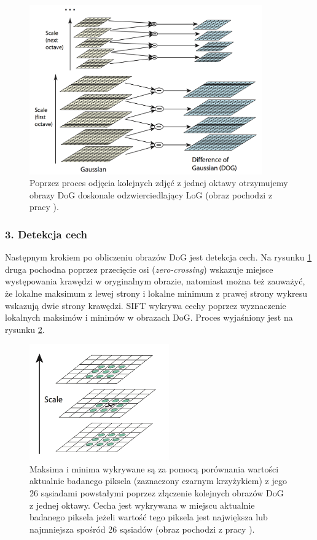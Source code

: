 \begin{figure}[htb]
  \centering
  \includegraphics[width=10cm]{gfx/dog}
  \caption{Poprzez proces odjęcia kolejnych zdjęć z jednej oktawy otrzymujemy obrazy DoG doskonale odzwierciedlający LoG (obraz pochodzi z pracy \cite{Lowe:2004:DIF:993451.996342}).}
  \label{fig:proponowane_algorytmy:dog}
\end{figure}

\subsubsection{3. Detekcja cech}
\label{sec:proponowane_algorytmy:detekcja_cech}

Następnym krokiem po obliczeniu obrazów DoG jest detekcja cech. Na rysunku \ref{fig:proponowane_algorytmy:dog} druga pochodna poprzez przecięcie osi (\textit{zero-crossing}) wskazuje miejsce występowania krawędzi w oryginalnym obrazie, natomiast można też zauważyć, że lokalne maksimum z lewej strony i lokalne minimum z prawej strony wykresu wskazują dwie strony krawędzi. SIFT wykrywa cechy poprzez wyznaczenie lokalnych maksimów i minimów w obrazach DoG. Proces wyjaśniony jest na rysunku \ref{fig:proponowane_algorytmy:max}.

\begin{figure}[H]
  \centering
  \includegraphics[width=6cm]{gfx/max}
  \caption{Maksima i minima wykrywane są za pomocą porównania wartości aktualnie badanego piksela (zaznaczony czarnym krzyżykiem) z jego 26 sąsiadami powstałymi poprzez złączenie kolejnych obrazów DoG z jednej oktawy. Cecha jest wykrywana w miejscu aktualnie badanego piksela jeżeli wartość tego piksela jest największa lub najmniejsza spośród 26 sąsiadów (obraz pochodzi z pracy \cite{Lowe:2004:DIF:993451.996342}).}
  \label{fig:proponowane_algorytmy:max}
\end{figure}

